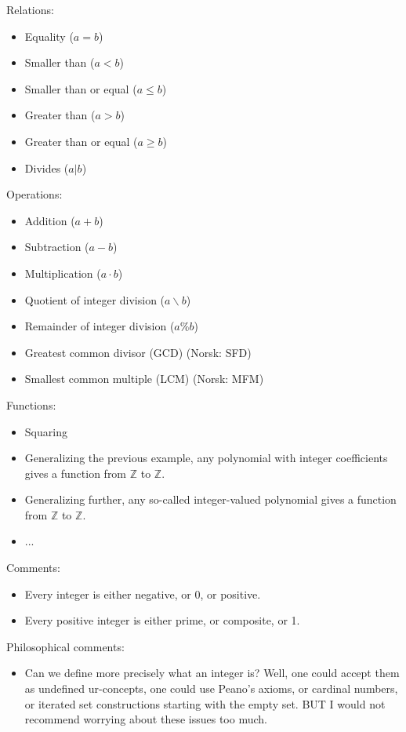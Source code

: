 \documentclass[12pt]{amsart}
\begin{document}
Relations:
\smallskip
\begin{itemize}
  \item Equality ($a=b$)
  \item Smaller than ($a<b$)
  \item Smaller than or equal ($a \leq b$)
  \item Greater than ($a>b$)
  \item Greater than or equal ($a \geq b$)
  \item Divides ($a \vert b$)
\end{itemize}
\bigskip

Operations:
\smallskip
\begin{itemize}
  \item Addition ($a+b$)
  \item Subtraction ($a-b$)
  \item Multiplication ($a \cdot b$)
  \item Quotient of integer division ($a \backslash b$)
  \item Remainder of integer division ($a \% b$)
  \item Greatest common divisor (GCD) (Norsk: SFD)
  \item Smallest common multiple (LCM) (Norsk: MFM)
\end{itemize}
\bigskip

Functions:
\smallskip
\begin{itemize}
  \item Squaring
  \item Generalizing the previous example, any polynomial with integer coefficients gives a function from $\mathbb{Z}$ to $\mathbb{Z}$.
  \item Generalizing further, any so-called integer-valued polynomial gives a function from $\mathbb{Z}$ to $\mathbb{Z}$.
  \item ...
\end{itemize}
\bigskip

Comments:
\smallskip
\begin{itemize}
\item Every integer is either negative, or 0, or positive.
\item Every positive integer is either prime, or composite, or 1.
\end{itemize}
\bigskip

Philosophical comments:
\smallskip
\begin{itemize}
\item Can we define more precisely what an integer is? Well, one could accept them as undefined ur-concepts, one could use Peano's axioms, or cardinal numbers, or iterated set constructions starting with the empty set. BUT I would not recommend worrying about these issues too much.
\end{itemize}
\bigskip
\end{document}
